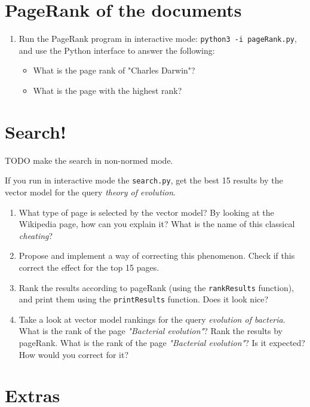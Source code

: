 \documentclass[mathserif, 11pt,c]{article}
\begin{document}
\section{PageRank of the documents}

\begin{enumerate}[label=\textbf{Q\thesection.\arabic*}]
	\item Run the PageRank program in interactive mode: \texttt{python3 -i pageRank.py}, and use the Python interface to answer the following:
	\begin{itemize}
		\item What is the page rank of "Charles Darwin"?
		\item What is the page with the highest rank?
	\end{itemize}
\end{enumerate}

\section{Search!}


TODO make the search in non-normed mode.


If you run in interactive mode the \texttt{search.py}, get the best 15 results by the vector model for the query \textit{theory of evolution}.

\begin{enumerate}[label=\textbf{Q\thesection.\arabic*}]
	\item What type of page is selected by the vector model? By looking at the Wikipedia page, how can you explain it? What is the name of this classical \textit{cheating}?
	\item Propose and implement a way of correcting this phenomenon. Check if this correct the effect for the top 15 pages.
	\item Rank the results according to pageRank (using the \texttt{rankResults} function), and print them using the \texttt{printResults} function. Does it look nice?
	\item Take a look at vector model rankings for the query \textit{evolution of bacteria}. What is the rank of the page \textit{"Bacterial evolution"}? Rank the results by pageRank. What is the rank of the page \textit{"Bacterial evolution"}? Is it expected? How would you correct for it?
\end{enumerate}


\section{Extras}
\end{document}
